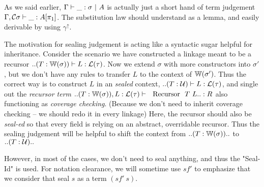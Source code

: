 As we said earlier, ${ {\Gamma} \vdash {\_} : {\sigma} \ |\ {A} }$ is actually just a short hand of term judgement ${ {\Gamma , {\mathcal{C}} \sigma} \vdash {\_} : {A[\pi_1]} }$. The substitution law should understand as a lemma, and easily derivable by using $\gamma^\uparrow$. 

The motivation for sealing judgement is acting like a syntactic sugar helpful for inheritance. Consider the scenario we have constructed a linkage meant to be a recursor $  .. (T : {\mathbb{W}}(\sigma)) \vdash L : {\mathcal{L}}(\tau)$. Now we extend $\sigma$ with more constructors into $\sigma'$, but we don't have any rules to transfer $L$ to the context of ${\mathbb{W}}(\sigma')$. Thus the correct way is to construct $L$ in an \textit{sealed} context, $  .. (T : {\mathcal{U}}) \vdash L : {\mathcal{L}}(\tau)$, and single out the \textit{recursor term}  $.. (T : \bW(\sigma)), L : \cL(\tau) \vdash \ \text{ Recursor } \ T \ L .. : R $ also functioning as \textit{coverage checking}.
(Because we don't need to inherit coverage checking -- we should redo it in every linkage) Here, the recursor should also be \textit{seal-ed} so that every field is relying on an abstract, overridable recursor.
Thus the sealing judgement will be helpful to shift the context from $.. (T : {\mathbb{W}}(\sigma)) .. $ to $.. (T : {\mathcal{U}}) ..$

However, in most of the cases, we don't need to seal anything, and thus the "Seal-Id" is used. For notation clearance, we will sometime use $sf'$ to emphasize that we consider that seal $s$ as a term $(sf' \ s)$. 


